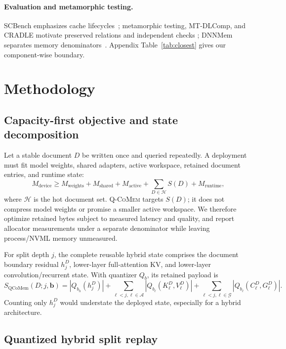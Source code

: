 \documentclass{article}
\newcommand{\qcomem}{\textsc{Q-CoMem}}
\begin{document}
\paragraph{Evaluation and metamorphic testing.}
SCBench emphasizes cache lifecycles~\citep{li2025scbench}; metamorphic testing,
MT-DLComp, and CRADLE motivate preserved relations and independent checks
\citep{chen2018metamorphic,xiao2022metamorphic,pham2019cradle}; DNNMem separates
memory denominators~\citep{gao2020dnnmem}.  Appendix Table~\ref{tab:closest}
gives our component-wise boundary.

\section{Methodology}
\label{sec:method}
\label{sec:contract}

\subsection{Capacity-first objective and state decomposition}

Let a stable document $D$ be written once and queried repeatedly.  A deployment
must fit model weights, shared adapters, active workspace, retained document
entries, and runtime state:
\begin{equation}
 M_{\mathrm{device}} \geq M_{\mathrm{weights}}+M_{\mathrm{shared}}
 +M_{\mathrm{active}}+\sum_{D\in\mathcal{H}}S(D)+M_{\mathrm{runtime}},
\end{equation}
where $\mathcal{H}$ is the hot document set.  \qcomem{} targets $S(D)$; it does
not compress model weights or promise a smaller active workspace.  We therefore
optimize retained bytes subject to measured latency and quality, and report
allocator measurements under a separate denominator while leaving process/NVML
memory unmeasured.

For split depth $j$, the complete reusable hybrid state comprises the document
boundary residual $h_j^D$, lower-layer full-attention KV, and lower-layer
convolution/recurrent state.  With quantizer $Q_b$, its retained payload is
\begin{equation}
 S_{\mathrm{QCoMem}}(D;j,\mathbf b)=|Q_{b_h}(h_j^D)|+
 \sum_{\ell<j,\ell\in\mathcal A}|Q_{b_\ell}(K^D_\ell,V^D_\ell)|+
 \sum_{\ell<j,\ell\in\mathcal G}|Q_{b_\ell}(C^D_\ell,G^D_\ell)|.
\end{equation}
Counting only $h_j^D$ would understate the deployed state, especially for a
hybrid architecture.

\subsection{Quantized hybrid split replay}
\end{document}
